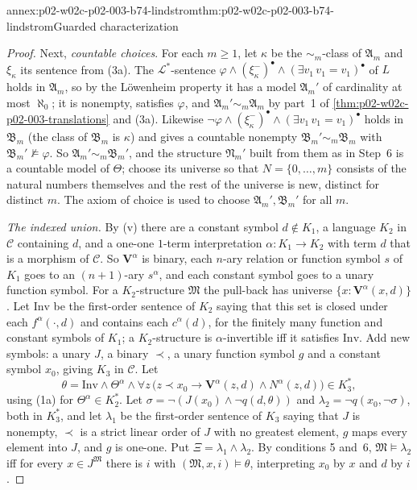 \begin{annexitem}{annex:p02-w02c-p02-003-b74-lindstrom}{thm:p02-w02c-p02-003-b74-lindstrom}{Guarded characterization}
\begin{proof}
Next, \emph{countable choices}.  For each \(m\geq1\), let \(\kappa\) be the
\(\sim_m\)-class of \(\mathfrak A_m\) and \(\xi_\kappa\) its sentence from
(3a).  The \(\mathcal L^{\ast}\)-sentence \(\varphi\land(\xi_\kappa^{-})^{\bullet}
\land(\exists v_1\,v_1=v_1)^{\bullet}\) of \(L\) holds in \(\mathfrak A_m\), so
by the L\"owenheim property it has a model \(\mathfrak A_m'\) of cardinality
at most \(\aleph_0\); it is nonempty, satisfies \(\varphi\), and
\(\mathfrak A_m'\sim_m\mathfrak A_m\) by part~1 of
\cref{thm:p02-w02c-p02-003-translations} and (3a).  Likewise
\(\neg\varphi\land(\xi_\kappa^{-})^{\bullet}\land(\exists v_1\,v_1=v_1)^{\bullet}\)
holds in \(\mathfrak B_m\) (the class of \(\mathfrak B_m\) is \(\kappa\)) and
gives a countable nonempty \(\mathfrak B_m'\sim_m\mathfrak B_m\) with
\(\mathfrak B_m'\not\models\varphi\).  So \(\mathfrak A_m'\sim_m\mathfrak
B_m'\), and the structure \(\mathfrak N_m'\) built from them as in Step~6
is a countable model of \(\Theta\); choose its universe so that
\(N=\{0,\ldots,m\}\) consists of the natural numbers themselves and the
rest of the universe is new, distinct for distinct \(m\).  The axiom of
choice is used to choose \(\mathfrak A_m',\mathfrak B_m'\) for all \(m\).

\emph{The indexed union.}  By (v) there are a constant symbol \(d\notin
K_1\), a language \(K_2\) in \(\mathcal C\) containing \(d\), and a one-one
\(1\)-term interpretation \(\alpha:K_1\to K_2\) with term \(d\) that is a
morphism of \(\mathcal C\).  So \(\mathbf V^{\alpha}\) is binary, each
\(n\)-ary relation or function symbol \(s\) of \(K_1\) goes to an
\((n+1)\)-ary \(s^{\alpha}\), and each constant symbol goes to a unary
function symbol.  For a \(K_2\)-structure \(\mathfrak M\) the pull-back has
universe \(\{x:\mathbf V^{\alpha}(x,d)\}\).  Let \(\mathrm{Inv}\) be the
first-order sentence of \(K_2\) saying that this set is closed under each
\(f^{\alpha}(\cdot,d)\) and contains each \(c^{\alpha}(d)\), for the finitely
many function and constant symbols of \(K_1\); a \(K_2\)-structure is
\(\alpha\)-invertible iff it satisfies \(\mathrm{Inv}\).  Add new symbols: a
unary \(J\), a binary \(\prec\), a unary function symbol \(g\) and a
constant symbol \(x_0\), giving \(K_3\) in \(\mathcal C\).  Let
\[
 \theta=\mathrm{Inv}\land\Theta^{\alpha}\land
 \forall z\,\bigl(z\prec x_0\to\mathbf V^{\alpha}(z,d)\land N^{\alpha}(z,d)\bigr)\in K_3^{\ast},
\]
using (1a) for \(\Theta^{\alpha}\in K_2^{\ast}\).  Let
\(\sigma=\neg(J(x_0)\land\neg q(d,\theta))\) and \(\lambda_2=\neg
q(x_0,\neg\sigma)\), both in \(K_3^{\ast}\), and let \(\lambda_1\) be the
first-order sentence of \(K_3\) saying that \(J\) is nonempty, \(\prec\) is a
strict linear order of \(J\) with no greatest element, \(g\) maps every
element into \(J\), and \(g\) is one-one.  Put
\(\Xi=\lambda_1\land\lambda_2\).  By conditions 5 and~6,
\(\mathfrak M\models\lambda_2\) iff for every \(x\in J^{\mathfrak M}\) there
is \(i\) with \((\mathfrak M,x,i)\models\theta\), interpreting \(x_0\) by
\(x\) and \(d\) by \(i\).


\end{proof}
\end{annexitem}
